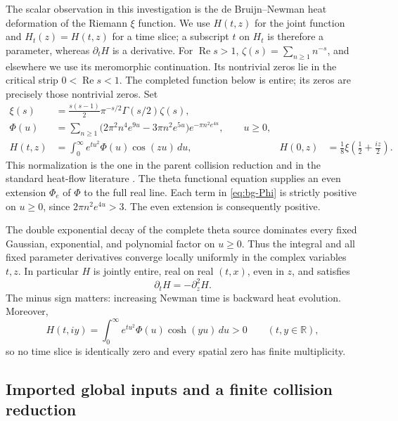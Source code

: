 \documentclass[11pt]{article}
\numberwithin{equation}{section}
\theoremstyle{definition}
\theoremstyle{remark}
\DeclareMathOperator{\Rea}{Re}
\begin{document}
The scalar observation in this investigation is the de Bruijn--Newman
heat deformation of the Riemann $\xi$ function. We use $H(t,z)$ for
the joint function and $H_t(z)=H(t,z)$ for a time slice; a subscript $t$
on $H_t$ is therefore a parameter, whereas $\partial_tH$ is a derivative.
For $\Rea s>1$, $\zeta(s)=\sum_{n\ge1}n^{-s}$, and elsewhere
we use its meromorphic continuation. Its nontrivial zeros lie in the
critical strip $0<\Rea s<1$. The completed function below is entire;
its zeros are precisely those nontrivial zeros. Set
\begin{align}
 \xi(s)&=\frac{s(s-1)}2\pi^{-s/2}\Gamma(s/2)\zeta(s),\nonumber\\
 \Phi(u)&=\sum_{n\ge1}
 \bigl(2\pi^2n^4e^{9u}-3\pi n^2e^{5u}\bigr)
 e^{-\pi n^2e^{4u}},\qquad u\ge0,\label{eq:bg-Phi}\\
 H(t,z)&=\int_0^\infty e^{tu^2}\Phi(u)\cos(zu)\,du,
 &H(0,z)&=\frac18\xi\!\left(\frac12+\frac{iz}2\right).
 \label{eq:bg-H}
\end{align}
This normalization is the one in the parent collision reduction and in
the standard heat-flow literature \cite{polymath,newmanwu,parentcollision}.
The theta functional equation supplies an even extension $\Phi_e$ of
$\Phi$ to the full real line. Each term in \eqref{eq:bg-Phi} is strictly
positive on $u\ge0$, since
$2\pi n^2e^{4u}>3$. The even extension is consequently positive.

The double exponential decay of the complete theta source dominates
every fixed Gaussian, exponential, and polynomial factor on $u\ge0$.
Thus the integral and all fixed parameter derivatives converge locally
uniformly in the complex variables $t,z$. In particular $H$ is jointly
entire, real on real $(t,x)$, even in $z$, and satisfies
\begin{equation}
 \partial_t H=-\partial_z^2H.
 \label{eq:bg-backward-heat}
\end{equation}
The minus sign matters: increasing Newman time is backward heat
evolution. Moreover,
\begin{equation}
 H(t,iy)=\int_0^\infty e^{tu^2}\Phi(u)\cosh(yu)\,du>0
 \qquad(t,y\in\mathbb R),
 \label{eq:bg-imaginary-positive}
\end{equation}
so no time slice is identically zero and every spatial zero has finite
multiplicity.

\subsection{Imported global inputs and a finite collision reduction}
\end{document}
